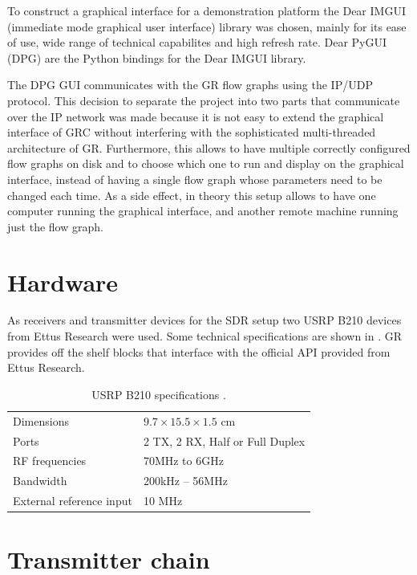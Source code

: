 To construct a graphical interface for a demonstration platform the Dear IMGUI (immediate mode graphical user interface) library was chosen, mainly for its ease of use, wide range of technical capabilites and high refresh rate. Dear PyGUI (DPG) are the Python bindings for the Dear IMGUI library.

The DPG GUI communicates with the GR flow graphs using the IP/UDP protocol. This decision to separate the project into two parts that communicate over the IP network was made because it is not easy to extend the graphical interface of GRC without interfering with the sophisticated multi-threaded architecture of GR. Furthermore, this allows to have multiple correctly configured flow graphs on disk and to choose which one to run and display on the graphical interface, instead of having a single flow graph whose parameters need to be changed each time. As a side effect, in theory this setup allows to have one computer running the graphical interface, and another remote machine running just the flow graph.

\section{Hardware}

As receivers and transmitter devices for the SDR setup two USRP B210 devices from Ettus Research were used. Some technical specifications are shown in . GR provides off the shelf blocks that interface with the official API provided from Ettus Research.

\begin{table}[h]
	\centering
	\begin{tabular}{ll}
		\toprule
		Dimensions               & \(9.7 \times 15.5 \times 1.5\) cm \\
		Ports                    & 2 TX, 2 RX, Half or Full Duplex   \\
		RF frequencies           & 70MHz to 6GHz                     \\
		Bandwidth                & 200kHz -- 56MHz                   \\
		External reference input & 10 MHz                            \\
		\bottomrule
	\end{tabular}
	\caption{USRP B210 specifications \cite{EttusUSRPB210}. \label{tab:usrp-specs}}
\end{table}

\section{Transmitter chain}

